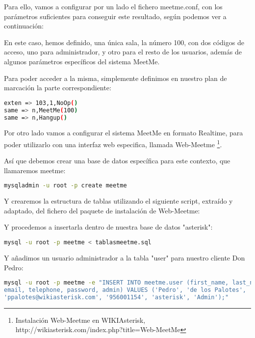 {Para ello, vamos a configurar por un lado el fichero meetme.conf, con los parámetros suficientes para conseguir este resultado, según podemos ver a continuación:



En este caso, hemos definido, una única sala, la número 100, con dos códigos de acceso, uno para administrador, y otro para el resto de los usuarios, además de algunos parámetros específicos del sistema MeetMe.

Para poder acceder a la misma, simplemente definimos en nuestro plan de marcación la parte correspondiente:

\begin{lstlisting}[language=bash,title={/etc/asterisk/extensions.conf}]
exten => 103,1,NoOp()
same => n,MeetMe(100)
same => n,Hangup()
\end{lstlisting}

Por otro lado vamos a configurar el sistema MeetMe en formato Realtime, para poder utilizarlo con una interfaz web especifica, llamada Web-Meetme \footnote{Instalación Web-Meetme en WIKIAsterisk, http://wikiasterisk.com/index.php?title=Web-MeetMe}.

Así que debemos crear una base de datos específica para este contexto, que llamaremos meetme:

\begin{lstlisting}[language=sh]
mysqladmin -u root -p create meetme
\end{lstlisting}

Y crearemos la estructura de tablas utilizando el siguiente script, extraído y adaptado, del fichero del paquete de instalación de Web-Meetme:



Y procedemos a insertarla dentro de nuestra base de datos "asterisk":

\begin{lstlisting}[language=sh]
mysql -u root -p meetme < tablasmeetme.sql
\end{lstlisting}

Y añadimos un usuario administrador a la tabla "user" para nuestro cliente Don Pedro:

\begin{lstlisting}[language=sh]
mysql -u root -p meetme -e "INSERT INTO meetme.user (first_name, last_name, 
email, telephone, password, admin) VALUES ('Pedro', 'de los Palotes', 
'ppalotes@wikiasterisk.com', '956001154', 'asterisk', 'Admin');"
\end{lstlisting}

}
